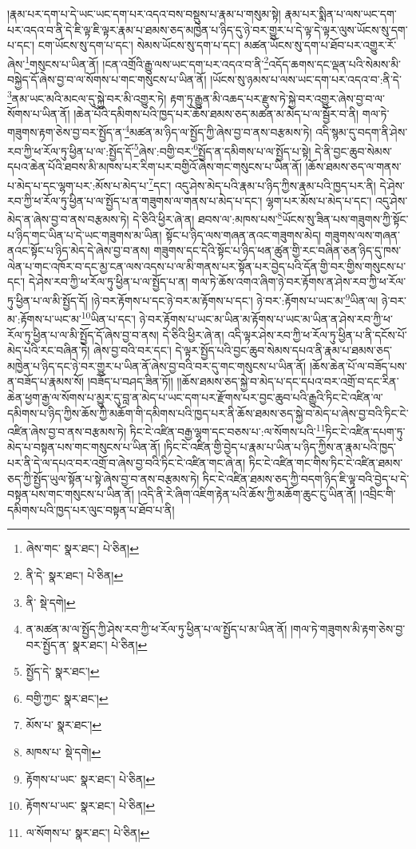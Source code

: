 །རྣམ་པར་དག་པ་དེ་ཡང་ཡང་དག་པར་འདའ་བས་བསྡུས་པ་རྣམ་པ་གསུམ་སྟེ། རྣམ་པར་སྨིན་པ་ལས་ཡང་དག་པར་འདའ་བ་ནི་དེ་ཇི་ལྟ་ཇི་ལྟར་རྣམ་པ་ཐམས་ཅད་མཁྱེན་པ་ཉིད་དུ་ཉེ་བར་གྱུར་པ་དེ་ལྟ་དེ་ལྟར་ལུས་ཡོངས་སུ་དག་པ་དང་། ངག་ཡོངས་སུ་དག་པ་དང་། སེམས་ཡོངས་སུ་དག་པ་དང་། མཚན་ཡོངས་སུ་དག་པ་ཐོབ་པར་འགྱུར་རོ་ཞེས་\footnote{ཞེས་གང་  སྣར་ཐང་།  པེ་ཅིན། }གསུངས་པ་ཡིན་ནོ། །ངན་འགྲོའི་རྒྱུ་ལས་ཡང་དག་པར་འདའ་བ་ནི་\footnote{ནི་དེ་  སྣར་ཐང་།  པེ་ཅིན། }འདོད་ཆགས་དང་ལྡན་པའི་སེམས་མི་བསྐྱེད་དོ་ཞེས་བྱ་བ་ལ་སོགས་པ་གང་གསུངས་པ་ཡིན་ནོ། །ཡོངས་སུ་ཉམས་པ་ལས་ཡང་དག་པར་འདའ་བ་:ནི་དེ་\footnote{ནི་  སྡེ་དགེ། }ནམ་ཡང་མའི་མངལ་དུ་སྐྱེ་བར་མི་འགྱུར་ཏེ། རྟག་ཏུ་རྒྱུན་མི་འཆད་པར་རྫུས་ཏེ་སྐྱེ་བར་འགྱུར་ཞེས་བྱ་བ་ལ་སོགས་པ་ཡིན་ནོ། །ཆེན་པོའི་དམིགས་པའི་ཁྱད་པར་ཆོས་ཐམས་ཅད་མཚན་མ་མེད་པ་ལ་སྦྱོར་བ་ནི། གལ་ཏེ་གཟུགས་རྟག་ཅེས་བྱ་བར་སྤྱོད་ན་\footnote{ན་མཚན་མ་ལ་སྤྱོད་ཀྱི་ཤེས་རབ་ཀྱི་ཕ་རོལ་ཏུ་ཕྱིན་པ་ལ་སྤྱོད་པ་མ་ཡིན་ནོ། །གལ་ཏེ་གཟུགས་མི་རྟག་ཅེས་བྱ་བར་སྤྱོད་ན་  སྣར་ཐང་།  པེ་ཅིན། }མཚན་མ་ཉིད་ལ་སྤྱོད་ཀྱི་ཞེས་བྱ་བ་ནས་བརྩམས་ཏེ། འདི་སྙམ་དུ་བདག་ནི་ཤེས་རབ་ཀྱི་ཕ་རོལ་ཏུ་ཕྱིན་པ་ལ་:སྤྱོད་དོ་\footnote{སྤྱོད་དེ་  སྣར་ཐང་། }ཞེས་:བགྱི་བར་\footnote{བགྱི་ཀྱང་  སྣར་ཐང་། }སྤྱོད་ན་དམིགས་པ་ལ་སྤྱོད་པ་སྟེ། དེ་ནི་བྱང་ཆུབ་སེམས་དཔའ་ཆེན་པོའི་ཐབས་མི་མཁས་པར་རིག་པར་བགྱིའོ་ཞེས་གང་གསུངས་པ་ཡིན་ནོ། །ཆོས་ཐམས་ཅད་ལ་གནས་པ་མེད་པ་དང་ལྷག་པར་:མོས་པ་མེད་པ་\footnote{མོས་པ་  སྣར་ཐང་། }དང་། འདུ་ཤེས་མེད་པའི་རྣམ་པ་ཉིད་ཀྱིས་རྣམ་པའི་ཁྱད་པར་ནི། དེ་ཤེས་རབ་ཀྱི་ཕ་རོལ་ཏུ་ཕྱིན་པ་ལ་སྤྱོད་པ་ན་གཟུགས་ལ་གནས་པ་མེད་པ་དང་། ལྷག་པར་མོས་པ་མེད་པ་དང་། འདུ་ཤེས་མེད་ན་ཞེས་བྱ་བ་ནས་བརྩམས་ཏེ། དེ་ཅིའི་ཕྱིར་ཞེ་ན། ཐབས་ལ་:མཁས་པས་\footnote{མཁས་པ་  སྡེ་དགེ། }ཡོངས་སུ་ཟིན་པས་གཟུགས་ཀྱི་སྟོང་པ་ཉིད་གང་ཡིན་པ་དེ་ཡང་གཟུགས་མ་ཡིན། སྟོང་པ་ཉིད་ལས་གཞན་ནའང་གཟུགས་མེད། གཟུགས་ལས་གཞན་ནའང་སྟོང་པ་ཉིད་མེད་དེ་ཞེས་བྱ་བ་ནས། གཟུགས་དང་དེའི་སྟོང་པ་ཉིད་ཕན་ཚུན་གྱི་རང་བཞིན་ཅན་ཉིད་དུ་ཁས་ལེན་པ་གང་འཁོར་བ་དང་མྱ་ངན་ལས་འདས་པ་ལ་མི་གནས་པར་སྟོན་པར་བྱེད་པའི་དོན་གྱི་བར་གྱིས་གསུངས་པ་དང་། དེ་ཤེས་རབ་ཀྱི་ཕ་རོལ་ཏུ་ཕྱིན་པ་ལ་སྤྱོད་པ་ན། གལ་ཏེ་ཆོས་འགའ་ཞིག་ཉེ་བར་རྟོགས་ན་ཤེས་རབ་ཀྱི་ཕ་རོལ་ཏུ་ཕྱིན་པ་ལ་མི་སྤྱོད་དོ། །ཉེ་བར་རྟོགས་པ་དང་ཉེ་བར་མ་རྟོགས་པ་དང་། ཉེ་བར་:རྟོགས་པ་ཡང་མ་\footnote{རྟོགས་པ་ཡང་  སྣར་ཐང་།  པེ་ཅིན། }ཡིན་ལ། ཉེ་བར་མ་:རྟོགས་པ་ཡང་མ་\footnote{རྟོགས་པ་ཡང་  སྣར་ཐང་།  པེ་ཅིན། }ཡིན་པ་དང་། ཉེ་བར་རྟོགས་པ་ཡང་མ་ཡིན་མ་རྟོགས་པ་ཡང་མ་ཡིན་ན་ཤེས་རབ་ཀྱི་ཕ་རོལ་ཏུ་ཕྱིན་པ་ལ་མི་སྤྱོད་དོ་ཞེས་བྱ་བ་ནས། དེ་ཅིའི་ཕྱིར་ཞེ་ན། འདི་ལྟར་ཤེས་རབ་ཀྱི་ཕ་རོལ་ཏུ་ཕྱིན་པ་ནི་དངོས་པོ་མེད་པའི་རང་བཞིན་ཏེ། ཞེས་བྱ་བའི་བར་དང་། དེ་ལྟར་སྤྱོད་པའི་བྱང་ཆུབ་སེམས་དཔའ་ནི་རྣམ་པ་ཐམས་ཅད་མཁྱེན་པ་ཉིད་དང་ཉེ་བར་གྱུར་པ་ཡིན་ནོ་ཞེས་བྱ་བའི་བར་དུ་གང་གསུངས་པ་ཡིན་ནོ། །ཆོས་ཆེན་པོ་ལ་བཟོད་པས་ན་བཟོད་པ་རྣམས་སོ། །བཟོད་པ་བཤད་ཟིན་ཏོ།། །།ཆོས་ཐམས་ཅད་སྐྱེ་བ་མེད་པ་དང་དཔའ་བར་འགྲོ་བ་དང་རིན་ཆེན་ཕྱག་རྒྱ་ལ་སོགས་པ་མྱུར་དུ་བླ་ན་མེད་པ་ཡང་དག་པར་རྫོགས་པར་བྱང་ཆུབ་པའི་རྒྱུའི་ཏིང་ངེ་འཛིན་ལ་དམིགས་པ་ཉིད་ཀྱིས་ཆོས་ཀྱི་མཆོག་གི་དམིགས་པའི་ཁྱད་པར་ནི་ཆོས་ཐམས་ཅད་སྐྱེ་བ་མེད་པ་ཞེས་བྱ་བའི་ཏིང་ངེ་འཛིན་ཞེས་བྱ་བ་ནས་བརྩམས་ཏེ། ཏིང་ངེ་འཛིན་བརྒྱ་ལྷག་དང་བཅས་པ་:ལ་སོགས་པའི་\footnote{ལ་སོགས་པ་  སྣར་ཐང་།  པེ་ཅིན། }ཏིང་ངེ་འཛིན་དཔག་ཏུ་མེད་པ་བསྟན་པས་གང་གསུངས་པ་ཡིན་ནོ། །ཏིང་ངེ་འཛིན་གྱི་བྱེད་པ་རྣམ་པ་ཡིན་པ་ཉིད་ཀྱིས་ན་རྣམ་པའི་ཁྱད་པར་ནི་དེ་ལ་དཔའ་བར་འགྲོ་བ་ཞེས་བྱ་བའི་ཏིང་ངེ་འཛིན་གང་ཞེ་ན། ཏིང་ངེ་འཛིན་གང་གིས་ཏིང་ངེ་འཛིན་ཐམས་ཅད་ཀྱི་སྤྱོད་ཡུལ་སྟོན་པ་སྟེ་ཞེས་བྱ་བ་ནས་བརྩམས་ཏེ། ཏིང་ངེ་འཛིན་ཐམས་ཅད་ཀྱི་བདག་ཉིད་ཇི་ལྟ་བའི་བྱེད་པ་དེ་བསྟན་པས་གང་གསུངས་པ་ཡིན་ནོ། །འདི་ནི་རེ་ཞིག་འཇིག་རྟེན་པའི་ཆོས་ཀྱི་མཆོག་ཆུང་ངུ་ཡིན་ནོ། །འབྲིང་གི་དམིགས་པའི་ཁྱད་པར་ལུང་བསྟན་པ་ཐོབ་པ་ནི། 
